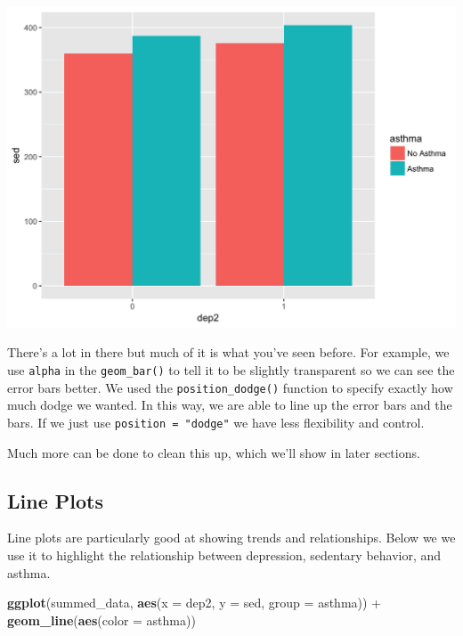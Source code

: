 \documentclass[]{tufte-book}
\newenvironment{Shaded}{}{}
\newcommand{\KeywordTok}[1]{\textcolor[rgb]{0.00,0.44,0.13}{\textbf{#1}}}
\newcommand{\DataTypeTok}[1]{\textcolor[rgb]{0.56,0.13,0.00}{#1}}
\newcommand{\StringTok}[1]{\textcolor[rgb]{0.25,0.44,0.63}{#1}}
\newcommand{\OperatorTok}[1]{\textcolor[rgb]{0.40,0.40,0.40}{#1}}
\newcommand{\NormalTok}[1]{#1}
\theoremstyle{definition}
\theoremstyle{definition}
\theoremstyle{remark}
\begin{document}
\includegraphics{_main_files/figure-latex/unnamed-chunk-140-1}

There's a lot in there but much of it is what you've seen before. For
example, we use \texttt{alpha} in the \texttt{geom\_bar()} to tell it to
be slightly transparent so we can see the error bars better. We used the
\texttt{position\_dodge()} function to specify exactly how much dodge we
wanted. In this way, we are able to line up the error bars and the bars.
If we just use \texttt{position\ =\ "dodge"} we have less flexibility
and control.

Much more can be done to clean this up, which we'll show in later
sections.

\subsection*{Line Plots}\label{line-plots}

Line plots are particularly good at showing trends and relationships.
Below we we use it to highlight the relationship between depression,
sedentary behavior, and asthma.

\begin{Shaded}
\begin{Highlighting}[]
\KeywordTok{ggplot}\NormalTok{(summed_data, }\KeywordTok{aes}\NormalTok{(}\DataTypeTok{x =}\NormalTok{ dep2, }\DataTypeTok{y =}\NormalTok{ sed, }\DataTypeTok{group =}\NormalTok{ asthma)) }\OperatorTok{+}\StringTok{ }
\StringTok{    }\KeywordTok{geom_line}\NormalTok{(}\KeywordTok{aes}\NormalTok{(}\DataTypeTok{color =}\NormalTok{ asthma))}
\end{Highlighting}
\end{Shaded}
\end{document}
